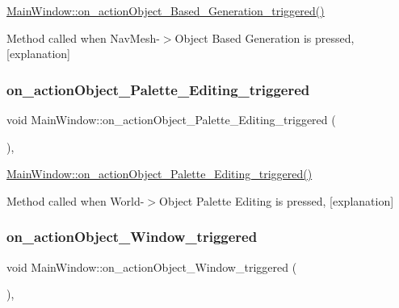 \hyperlink{class_main_window_a8a36e600870d52f9610f71b81f0cda1c}{Main\+Window\+::on\+\_\+action\+Object\+\_\+\+Based\+\_\+\+Generation\+\_\+triggered()} 

Method called when Nav\+Mesh-\/$>$Object Based Generation is pressed, \mbox{[}explanation\mbox{]} \mbox{\label{class_main_window_a730870f9625a5a193dcb54d0e757301a}} 
\subsubsection{\texorpdfstring{on\+\_\+action\+Object\+\_\+\+Palette\+\_\+\+Editing\+\_\+triggered}{on\_actionObject\_Palette\_Editing\_triggered}}
{\footnotesize\ttfamily void Main\+Window\+::on\+\_\+action\+Object\+\_\+\+Palette\+\_\+\+Editing\+\_\+triggered (\begin{DoxyParamCaption}{ }\end{DoxyParamCaption})\hspace{0.3cm}{\ttfamily [private]}, {\ttfamily [slot]}}



\hyperlink{class_main_window_a730870f9625a5a193dcb54d0e757301a}{Main\+Window\+::on\+\_\+action\+Object\+\_\+\+Palette\+\_\+\+Editing\+\_\+triggered()} 

Method called when World-\/$>$Object Palette Editing is pressed, \mbox{[}explanation\mbox{]} \mbox{\label{class_main_window_a584ef402e75f991b95af6dadbaac6354}} 
\subsubsection{\texorpdfstring{on\+\_\+action\+Object\+\_\+\+Window\+\_\+triggered}{on\_actionObject\_Window\_triggered}}
{\footnotesize\ttfamily void Main\+Window\+::on\+\_\+action\+Object\+\_\+\+Window\+\_\+triggered (\begin{DoxyParamCaption}{ }\end{DoxyParamCaption})\hspace{0.3cm}{\ttfamily [private]}, {\ttfamily [slot]}}



